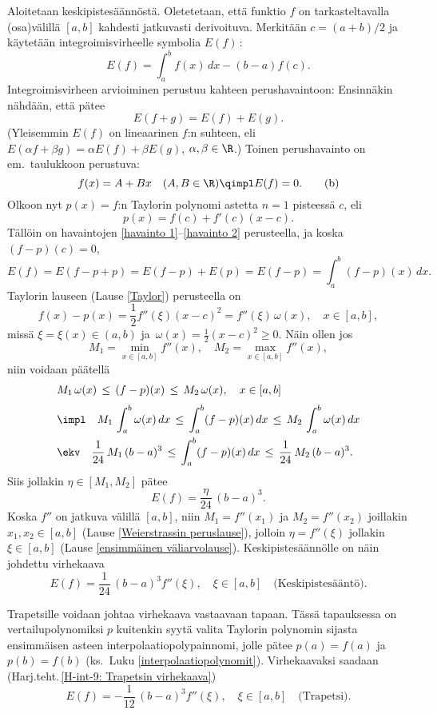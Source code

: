 Aloitetaan keskipistesäännöstä. Oletetetaan, että funktio $f$ on tarkasteltavalla (osa)välillä
$[a,b]$ kahdesti jatkuvasti derivoituva. Merkitään $c=(a+b)/2$ ja käytetään
integroimisvirheelle symbolia $E(f)\,$:
\[ 
E(f) = \int_a^b f(x)\,dx - (b-a)f(c). 
\]
Integroimisvirheen arvioiminen perustuu kahteen perushavaintoon: Ensinnäkin nähdään, että pätee
\begin{equation} \label{havainto 1}
E(f+g) = E(f)+E(g). \tag{a} 
\end{equation}
(Yleisemmin $E(f)$ on lineaarinen $f$:n suhteen, eli 
$E(\alpha f + \beta g) = \alpha E(f) + \beta E(g)$, $\alpha,\beta \in \R$.) Toinen
perushavainto on em.\ taulukkoon perustuva:
\begin{equation} \label{havainto 2}
f(x) = A + Bx \quad (A,B \in \R) \qimpl E(f)=0. \tag{b}
\end{equation}
Olkoon nyt $p(x)=f$:n Taylorin polynomi astetta $n=1$ pisteessä $c$, eli
\[ 
p(x) = f(c) + f'(c)(x-c). 
\]
Tällöin on havaintojen \eqref{havainto 1}--\eqref{havainto 2} perusteella, ja koska
$(f-p)(c)=0$,
\[
E(f) = E(f-p+p) = E(f-p) + E(p) = E(f-p) = \int_a^b (f-p)(x)\,dx.
\]
Taylorin lauseen (Lause \ref{Taylor}) perusteella on
\[ 
f(x)-p(x) = \frac{1}{2}f''(\xi)(x-c)^2 = f''(\xi)\,\omega(x), \quad x \in [a,b], 
\]
missä $\xi = \xi(x) \in (a,b)$ ja $\,\omega(x)=\tfrac{1}{2}(x-c)^2 \ge 0$. Näin ollen jos
\[ 
M_1 = \min_{x\in[a,b]} f''(x), \quad M_2 = \max_{x\in[a,b]} f''(x), 
\]
niin voidaan päätellä
\begin{align*}
&M_1\,\omega(x) \,\le\, (f-p)(x) \,\le\, M_2\,\omega(x), \quad x \in [a,b] \\[1mm]
&\impl\quad M_1\,\int_a^b \omega(x)\,dx 
                \,\le\, \int_a^b (f-p)(x)\,dx \,\le\, M_2\,\int_a^b \omega(x)\,dx \\
&\ekv\quad \frac{1}{24}\,M_1\,(b-a)^3    
                \,\le\, \int_a^b (f-p)(x)\,dx \,\le\, \frac{1}{24}\,M_2\,(b-a)^3.
\end{align*}
Siis jollakin $\eta \in [M_1,M_2]$ pätee
\[ 
E(f) = \frac{\eta}{24}\,(b-a)^3. 
\]
Koska $f''$ on jatkuva välillä $[a,b]$, niin $M_1=f''(x_1)$ ja $M_2=f''(x_2)$ joillakin
$x_1,x_2\in[a,b]$ (Lause \ref{Weierstrassin peruslause}), jolloin $\eta = f''(\xi)$ jollakin 
$\xi \in [a,b]$ (Lause \ref{ensimmäinen väliarvolause}). Keskipistesäännölle on näin johdettu
virhekaava
\[
\boxed{\quad E(f) = \frac{1}{24}\,(b-a)^3 f''(\xi), \quad \xi \in [a,b]
                                     \quad\text{(Keskipistesääntö)}. \quad}
\]

Trapetsille voidaan johtaa virhekaava vastaavaan tapaan. Tässä tapauksessa on
vertailupolynomiksi $p$ kuitenkin syytä valita Taylorin polynomin sijasta ensimmäisen asteen
interpolaatiopolypainnomi, jolle pätee $p(a)=f(a)$ ja $p(b)=f(b)$
(ks.\ Luku \ref{interpolaatiopolynomit}). Virhekaavaksi saadaan
(Harj.teht.\,\ref{H-int-9: Trapetsin virhekaava})
\[
\boxed{\quad E(f) = - \frac{1}{12}\,(b-a)^3 f''(\xi), \quad \xi \in [a,b] 
                                      \quad \text{(Trapetsi)}. \quad}
\]

